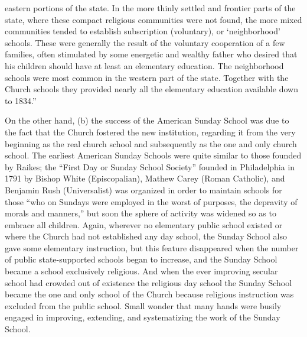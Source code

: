 eastern portions of the state. In the more thinly settled and frontier parts of the state, where these compact religious communities were not found, the more mixed communities tended to establish subscription (voluntary), or ‘neighborhood’ schools. These were generally the result of the voluntary cooperation of a few families, often stimulated by some energetic and wealthy father who desired that his children should have at least an elementary education. The neighborhood schools were most common in the western part of the state. Together with the Church schools they provided nearly all the elementary education available down to 1834.”

On the other hand, (b) the success of the American Sunday School was due to the fact that the Church fostered the new institution, regarding it from the very beginning as the real church school and subsequently as the one and only church school. The earliest American Sunday Schools were quite similar to those founded by Raikes; the “First Day or Sunday School Society” founded in Philadelphia in 1791 by Bishop White (Episcopalian), Mathew Carey (Roman Catholic), and Benjamin Rush (Universalist) was organized in order to maintain schools for those “who on Sundays were employed in the worst of purposes, the depravity of morals and manners,” but soon the sphere of activity was widened so as to embrace all children. Again, wherever no elementary public school existed or where the Church had not established any day school, the Sunday School also gave some elementary instruction, but this feature disappeared when the number of public state-supported schools began to increase, and the Sunday School became a school exclusively religious. And when the ever improving secular school had crowded out of existence the religious day school the Sunday School became the one and only school of the Church because religious instruction was excluded from the public school. Small wonder that many hands were busily engaged in improving, extending, and systematizing the work of the Sunday School.


